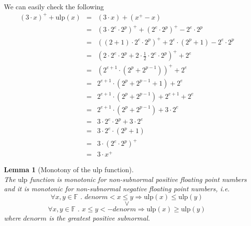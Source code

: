 \documentclass[a4paper,10pt,twoside]{article}
\newtheorem{lemma}[theorem]{Lemma}
\newenvironment{proof}[1][Proof]{\begin{trivlist}
\item[\hskip \labelsep {\bfseries #1}]}{\end{trivlist}}
\newcommand{\qed}{\nobreak \ifvmode \relax \else \ifdim \lastskip<1.5em \hskip-\lastskip
\hskip1.5em plus0em minus0.5em \fi \nobreak \vrule height0.75em width0.5em depth0.25em\fi}
\newcommand{\F}{\ensuremath{\mathbb {F}}}
\newcommand{\mUlp}{\ensuremath{\mathrm{ulp}}}
\begin{document}
\begin{proof} ~ \\
We can easily check the following
\begin{eqnarray*}
\left( 3 \cdot x \right)^+ + \mUlp\left( x \right) & = & \left( 3 \cdot x \right) + \left( x^+ - x \right) \\
& = & \left( 3 \cdot 2^e \cdot 2^p \right)^+ + \left( 2^e \cdot 2^p \right)^+ - 2^e \cdot 2^p \\
& = & \left( \left( 2 + 1 \right) \cdot 2^e \cdot 2^p \right)^+ + 2^e \cdot \left( 2^p + 1 \right) - 2^e \cdot 2^p \\
& = & \left( 2 \cdot 2^e \cdot 2^p + 2 \cdot \frac{1}{2} \cdot 2^e \cdot 2^p \right)^+ + 2^e \\
& = & \left( 2^{e+1} \cdot \left( 2^p + 2^{p-1} \right) \right)^+ + 2^e \\
& = & 2^{e+1} \cdot \left( 2^p + 2^{p-1} + 1 \right) + 2^e \\
& = & 2^{e+1} \cdot \left( 2^p + 2^{p-1} \right) + 2^{e+1} + 2^e \\
& = & 2^{e+1} \cdot \left( 2^p + 2^{p-1} \right) + 3 \cdot 2^e \\
& = & 3 \cdot 2^e \cdot 2^p + 3 \cdot 2^e \\
& = & 3 \cdot 2^e \cdot \left( 2^p + 1 \right) \\
& = & 3 \cdot \left( 2^e \cdot 2^p \right)^+ \\
& = & 3 \cdot x^+
\end{eqnarray*}
\qed
\end{proof}
\begin{lemma}[Monotony of the $\mUlp$ function] \label{ulpmonoton} ~ \\
The $\mUlp$ function is monotonic for non-subnormal positive floating point numbers and it is monotonic for non-subnormal
negative floating point numbers, i.e.
$$\forall x,y \in \F \mbox{ . } denorm < x \leq y \Rightarrow \mUlp\left( x \right) \leq \mUlp\left( y \right)$$
$$\lor$$
$$\forall x,y \in \F \mbox{ . } x \leq y < -denorm \Rightarrow \mUlp\left( x \right) \geq \mUlp\left( y \right)$$
where $denorm$ is the greatest positive subnormal.
\end{lemma}
\end{document}
